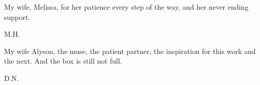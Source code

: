 \begin{minipage}[t]{0.8\textwidth}
	\raggedright
  	My wife, Melissa, for her patience every step of the way, and her never ending support. \par
  	\raggedleft
  	M.H.
\end{minipage} \vspace{1cm}


\begin{minipage}[t]{0.8\textwidth}
	\raggedright
  	My wife Alyson, the muse, the patient partner, the inspiration for this work and the next. And the box is still not full. \par
  	\raggedleft
  	D.N.
\end{minipage} 